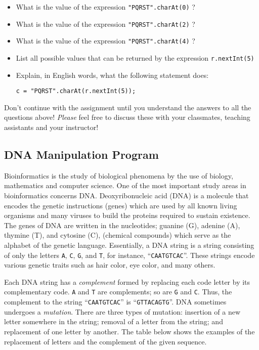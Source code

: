 \begin{itemize}
\begin{center}
\end{center}
\item
What is the value of the expression \verb$"PQRST".charAt(0)$ ?
\item
What is the value of the expression \verb$"PQRST".charAt(2)$ ?
\item
What is the value of the expression \verb$"PQRST".charAt(4)$ ?
\item
List all possible values that can be returned by the expression
\verb$r.nextInt(5)$
\item
Explain, in English words, what the following statement does:
\begin{center}
\verb$c = "PQRST".charAt(r.nextInt(5));$
\end{center}
\end{itemize}
Don't continue with the assignment until you understand the answers to all the
questions above! {\em Please} feel free to discuss these with your
classmates, teaching assistants and your instructor!

\vspace{-0.05in}
\subsection*{DNA Manipulation Program}
\vspace{-0.05in}
Bioinformatics is the study of biological phenomena by the use of biology, mathematics and computer science. One of the most important study areas in bioinformatics concerns DNA. Deoxyribonucleic acid (DNA) is a molecule that encodes the genetic instructions (genes) which are used by all known living organisms and many viruses to build the proteins required to sustain existence. The genes of DNA are written in the nucleotides; guanine (G), adenine (A), thymine (T), and cytosine (C), (chemical compounds) which serve as the alphabet of the genetic language.
Essentially, a DNA string is a string consisting of only the letters {\tt A}, {\tt C}, {\tt G}, and {\tt T}, for instance, ``{\tt CAATGTCAC}''. These strings encode
various genetic traits such as hair color, eye color, and many others.

Each DNA string has a {\em complement} formed by replacing each code letter by its
complementary code. {\tt A} and {\tt T} are complements; so are {\tt G} and
{\tt C}. Thus, the complement to the string ``{\tt CAATGTCAC}'' is
``{\tt GTTACAGTG}''.
DNA sometimes undergoes a {\em mutation}. There are three types of mutation:
insertion of a new letter somewhere in the string; removal of a letter from the
string; and replacement of one letter by another. The table below shows the examples of the replacement of letters and the complement of the given sequence.

